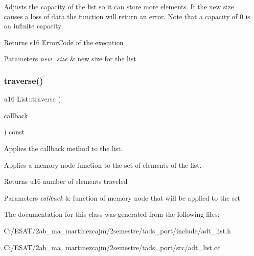 Adjusts the capacity of the list so it can store more elements. If the new size causes a loss of data the function will return an error. Note that a capacity of 0 is an infinite capacity

\begin{DoxyReturn}{Returns}
s16 Error\+Code of the execution 
\end{DoxyReturn}

\begin{DoxyParams}{Parameters}
{\em new\+\_\+size} & new size for the list \\
\hline
\end{DoxyParams}
\mbox{\label{class_list_ab727281af2fea05581f8f80a0a28d0f9}} 
\subsubsection{\texorpdfstring{traverse()}{traverse()}}
{\footnotesize\ttfamily u16 List\+::traverse (\begin{DoxyParamCaption}\item[{s16(Memory\+Node\+::$\ast$)()}]{callback }\end{DoxyParamCaption}) const}



Applies the callback method to the list. 

Applies a memory node function to the set of elements of the list.

\begin{DoxyReturn}{Returns}
u16 number of elements traveled 
\end{DoxyReturn}

\begin{DoxyParams}{Parameters}
{\em callback} & function of memory node that will be applied to the set \\
\hline
\end{DoxyParams}


The documentation for this class was generated from the following files\+:\begin{DoxyCompactItemize}
\item 
C\+:/\+E\+S\+A\+T/2ab\+\_\+ma\+\_\+martinezcajm/2semestre/tads\+\_\+port/include/adt\+\_\+list.\+h\item 
C\+:/\+E\+S\+A\+T/2ab\+\_\+ma\+\_\+martinezcajm/2semestre/tads\+\_\+port/src/adt\+\_\+list.\+cc\end{DoxyCompactItemize}
